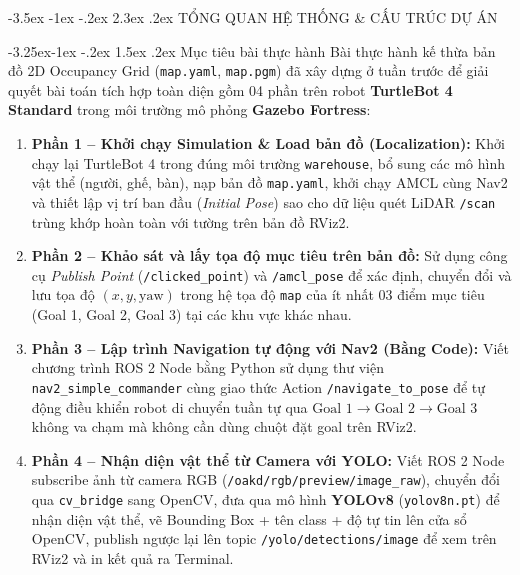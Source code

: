 \documentclass[11pt,a4paper]{article}
\makeatletter
\renewcommand{\section}{\@startsection{section}{1}{\z@}%
  {-3.5ex \@plus -1ex \@minus -.2ex}%
  {2.3ex \@plus.2ex}%
  {\normalfont\large\bfseries\color{primary}}}
\renewcommand{\subsection}{\@startsection{subsection}{2}{\z@}%
  {-3.25ex\@plus -1ex \@minus -.2ex}%
  {1.5ex \@plus .2ex}%
  {\normalfont\normalsize\bfseries\color{secondary}}}
\makeatother
\begin{document}
\newpage
{}
\tableofcontents
\newpage
{}
\setcounter{page}{1}

\section{TỔNG QUAN HỆ THỐNG \& CẤU TRÚC DỰ ÁN}

\subsection{Mục tiêu bài thực hành}
Bài thực hành kế thừa bản đồ 2D Occupancy Grid (\texttt{map.yaml}, \texttt{map.pgm}) đã xây dựng ở tuần trước để giải quyết bài toán tích hợp toàn diện gồm 04 phần trên robot \textbf{TurtleBot 4 Standard} trong môi trường mô phỏng \textbf{Gazebo Fortress}:
\begin{enumerate}
  \item \textbf{Phần 1 -- Khởi chạy Simulation \& Load bản đồ (Localization):} Khởi chạy lại TurtleBot 4 trong đúng môi trường \texttt{warehouse}, bổ sung các mô hình vật thể (người, ghế, bàn), nạp bản đồ \texttt{map.yaml}, khởi chạy AMCL cùng Nav2 và thiết lập vị trí ban đầu (\textit{Initial Pose}) sao cho dữ liệu quét LiDAR \texttt{/scan} trùng khớp hoàn toàn với tường trên bản đồ RViz2.
  \item \textbf{Phần 2 -- Khảo sát và lấy tọa độ mục tiêu trên bản đồ:} Sử dụng công cụ \textit{Publish Point} (\texttt{/clicked\_point}) và \texttt{/amcl\_pose} để xác định, chuyển đổi và lưu tọa độ $(x, y, \text{yaw})$ trong hệ tọa độ \texttt{map} của ít nhất 03 điểm mục tiêu (Goal 1, Goal 2, Goal 3) tại các khu vực khác nhau.
  \item \textbf{Phần 3 -- Lập trình Navigation tự động với Nav2 (Bằng Code):} Viết chương trình ROS 2 Node bằng Python sử dụng thư viện \texttt{nav2\_simple\_commander} cùng giao thức Action \texttt{/navigate\_to\_pose} để tự động điều khiển robot di chuyển tuần tự qua $\text{Goal 1} \to \text{Goal 2} \to \text{Goal 3}$ không va chạm mà không cần dùng chuột đặt goal trên RViz2.
  \item \textbf{Phần 4 -- Nhận diện vật thể từ Camera với YOLO:} Viết ROS 2 Node subscribe ảnh từ camera RGB (\texttt{/oakd/rgb/preview/image\_raw}), chuyển đổi qua \texttt{cv\_bridge} sang OpenCV, đưa qua mô hình \textbf{YOLOv8} (\texttt{yolov8n.pt}) để nhận diện vật thể, vẽ Bounding Box + tên class + độ tự tin lên cửa sổ OpenCV, publish ngược lại lên topic \texttt{/yolo/detections/image} để xem trên RViz2 và in kết quả ra Terminal.
\end{enumerate}
\end{document}

